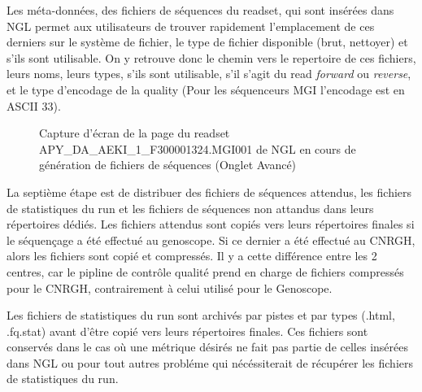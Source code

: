 Les méta-données, des fichiers de séquences du readset, qui sont insérées dans NGL permet aux utilisateurs de trouver rapidement l'emplacement de ces derniers sur le système de fichier, le type de fichier disponible (brut, nettoyer) et s'ils sont utilisable.
On y retrouve donc le chemin vers le repertoire de ces fichiers, leurs noms, leurs types, s'ils sont utilisable, s'il s'agit du read \emph{forward} ou \emph{reverse}, et le type d'encodage de la quality (Pour les séquenceurs MGI l'encodage est en ASCII 33).

\begin{figure}[H]
    \centering
    \caption{\footnotesize{Capture d'écran de la page du readset APY\_DA\_AEKI\_1\_F300001324.MGI001 de NGL en cours de génération de fichiers de séquences (Onglet \og Avancé\fg{})}}
    \label{meta-data-fastq}
\end{figure}

La septième étape est de distribuer des fichiers de séquences \og attendus\fg{}, les fichiers de statistiques du run et les fichiers de séquences \og non attandus\fg{} dans leurs répertoires dédiés.
Les fichiers attendus sont copiés vers leurs répertoires finales si le séquençage a été effectué au genoscope.
Si ce dernier a été effectué au CNRGH, alors les fichiers sont copié et compressés.
Il y a cette différence entre les 2 centres, car le pipline de contrôle qualité prend en charge de fichiers compressés pour le CNRGH, contrairement à celui utilisé pour le Genoscope.

Les fichiers de statistiques du run sont archivés par pistes et par types (.html, .fq.stat) avant d'être copié vers leurs répertoires finales.
Ces fichiers sont conservés dans le cas où une métrique désirés ne fait pas partie de celles insérées dans NGL ou pour tout autres probléme qui nécéssiterait de récupérer les fichiers de statistiques du run.

